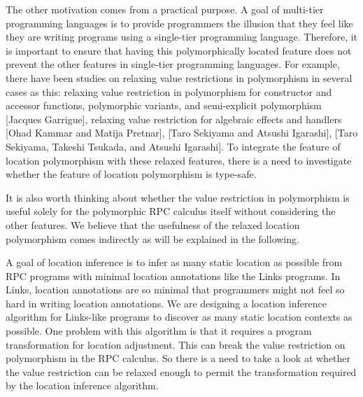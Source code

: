 \documentclass[a4paper]{article}
\theoremstyle{plain}
\theoremstyle{definition}
\begin{document}
%
The other motivation comes from a practical purpose.
%
A goal of multi-tier programming languages is to provide programmers
the illusion that they feel like they are writing programs using a
single-tier programming language.
%
Therefore, it is important to ensure that having this polymorphically
located feature does not prevent the other features in single-tier
programming languages.
%
For example, there have been studies on relaxing value restrictions in
polymorphism in several cases as this: relaxing value restriction in
polymorphism for constructor and accessor functions, polymorphic
variants, and semi-explicit polymorphism [Jacques Garrigue], relaxing
value restriction for algebraic effects and handlers [Ohad Kammar and
  Matija Pretnar], [Taro Sekiyama and Atsushi Igarashi], [Taro
  Sekiyama, Takeshi Tsukada, and Atsushi Igarashi].
%  
To integrate the feature of location polymorphism with these relaxed
features, there is a need to investigate whether the feature of
location polymorphism is type-safe.
%

It is also worth thinking about whether the value restriction in
polymorphism is useful solely for the polymorphic RPC calculus itself
without considering the other features.
%
We believe that the usefulness of the relaxed location polymorphism
comes indirectly as will be explained in the following.

%
A goal of location inference is to infer as many static location as
possible from RPC programs with minimal location annotations like the
Links programs.
%
In Links, location annotations are so minimal that programmers might
not feel so hard in writing location annotations.
%
We are designing a location inference algorithm for Links-like
programs to discover as many static location contexts as possible.
%
One problem with this algorithm is that it requires a program
transformation for location adjustment.
%
This can break the value restriction on polymorphism in the RPC
calculus.
%
So there is a need to take a look at whether the value restriction can
be relaxed enough to permit the transformation required by the
location inference algorithm.

\end{document}
